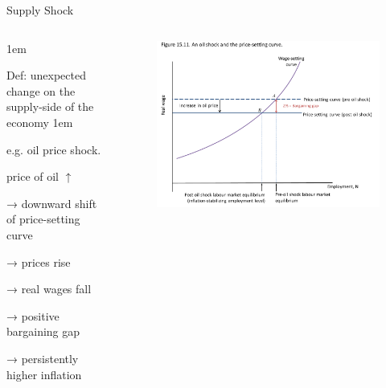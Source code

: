\documentclass[11pt,aspectratio=43,usenames,dvipsnames]{beamer}
\let\olditemize=\itemize
\let\endolditemize=\enditemize
\renewenvironment{itemize}{\olditemize \itemsep1em}{\endolditemize}
\theoremstyle{definition}
\begin{document}
\begin{frame}{Supply Shock}
\label{slide:Supply_Shock}
    \begin{columns}
        \begin{column}{0.4\textwidth}
            \begin{itemize}
                \item Def: unexpected change on the supply-side of the economy
                \begin{itemize}
                    \item e.g. oil price shock.
                \end{itemize}
                \item price of oil $ \uparrow  $
                \item → downward shift of price-setting curve
                \item → prices rise
                \item → real wages fall
                \item → positive bargaining gap
                \item → persistently higher inflation
            \end{itemize}

        \end{column}
        \begin{column}{0.6\textwidth}
            \begin{figure}
                \centering
                \includegraphics[width=\textwidth]{./figures/14.pdf}
            \end{figure}

        \end{column}
    \end{columns}

\end{frame}
\end{document}
